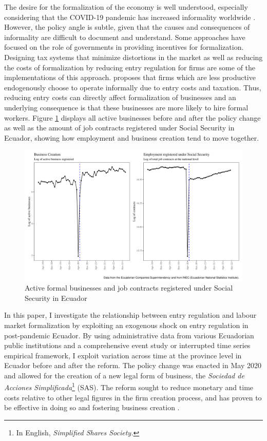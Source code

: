 \documentclass[11pt,a4paper]{article}\usepackage[]{graphicx}\usepackage[]{xcolor}
\makeatletter
\def\maxwidth{ %
  \ifdim\Gin@nat@width>\linewidth
    \linewidth
  \else
    \Gin@nat@width
  \fi
}
\newenvironment{knitrout}{}{} %
\makeatother
\begin{document}
The desire for the formalization of the economy is well understood, especially considering that the COVID-19 pandemic has increased informality worldwide \parencite{ILO.2022}. However, the policy angle is subtle, given that the causes and consequences of informality are difficult to document and understand. Some approaches have focused on the role of governments in providing incentives for formalization. Designing tax systems that minimize distortions in the market \parencite{Bardey.2019} as well as reducing the costs of formalization by reducing entry regulation for firms are some of the implementations of this approach. \textcite{MauricioPrado.2011} proposes that firms which are less productive endogenously choose to operate informally due to entry costs and taxation. Thus, reducing entry costs can directly affect formalization of businesses and an underlying consequence is that these businesses are more likely to hire formal workers. Figure \ref{fig:fig} displays all active businesses before and after the policy change as well as the amount of job contracts registered under Social Security in Ecuador, showing how employment and business creation tend to move together.

\begin{figure}[h]
\caption{Active formal businesses and job contracts registered under Social Security in Ecuador}
\label{fig:fig}
\begin{knitrout}
\color{fgcolor}
\includegraphics[width=\maxwidth]{figure/figure-1-1} 
\end{knitrout}
\end{figure}

In this paper, I investigate the relationship between entry regulation and labour market formalization by exploiting an exogenous shock on entry regulation in post-pandemic Ecuador. By using administrative data from various Ecuadorian public institutions and a comprehensive event study or interrupted time series empirical framework, I exploit variation across time at the province level in Ecuador before and after the reform. The policy change was enacted in May 2020 and allowed for the creation of a new legal form of business, the \textit{Sociedad de Acciones Simplificada}\footnote{In English, \textit{Simplified Shares Society.}} (SAS). The reform sought to reduce monetary and time costs relative to other legal figures in the firm creation process, and has proven to be effective in doing so and fostering business creation \parencite{CaminoMogro.2022}.
\end{document}
